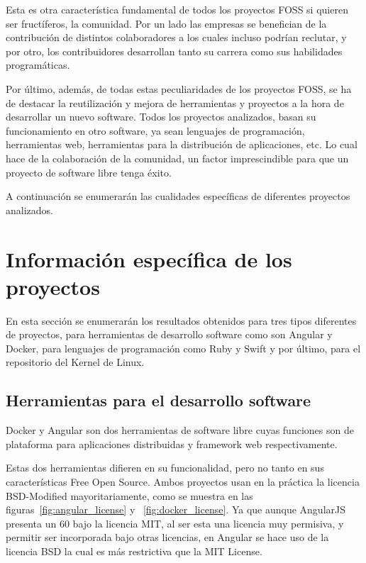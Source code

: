\documentclass[a4paper, spanish, 12pt]{book}
\begin{document}
Esta es otra caracter\'istica fundamental de todos los proyectos FOSS si quieren ser fruct\'iferos, la comunidad.
Por un lado las empresas se benefician de la contribuci\'on de distintos colaboradores a los cuales incluso
podr\'ian reclutar, y por otro, los contribuidores desarrollan tanto su carrera como sus habilidades program\'aticas.

Por \'ultimo, adem\'as, de todas estas peculiaridades de los proyectos FOSS, se ha de destacar la reutilizaci\'on y
mejora de herramientas y proyectos a la hora de desarrollar un nuevo software. Todos los proyectos analizados,
basan su funcionamiento en otro software, ya sean lenguajes de programaci\'on, herramientas web, herramientas para
la distribuci\'on de aplicaciones, etc. Lo cual hace de la colaboraci\'on de la comunidad, un factor imprescindible
para que un proyecto de software libre tenga \'exito.

A continuaci\'on se enumerar\'an las cualidades espec\'ificas de diferentes proyectos analizados.

\section{Informaci\'on espec\'ifica de los proyectos}
\label{sec:specific_info}

En esta secci\'on se enumerar\'an los resultados obtenidos para tres tipos diferentes de proyectos,
para herramientas de desarrollo software como son Angular y Docker, para lenguajes de programaci\'on como
Ruby y Swift y por \'ultimo, para el repositorio del Kernel de Linux.

\subsection{Herramientas para el desarrollo software}
\label{subsec:software_tools}

Docker y Angular son dos herramientas de software libre cuyas funciones son de plataforma para aplicaciones distribuidas
y framework web respectivamente.

Estas dos herramientas difieren en su funcionalidad, pero no tanto en sus caracter\'isticas Free Open Source.
Ambos proyectos usan en la pr\'actica la licencia BSD-Modified mayoritariamente, como se muestra en las
figuras~\ref{fig:angular_license} y ~\ref{fig:docker_license}. Ya que aunque AngularJS presenta un 60%
bajo la licencia MIT, al ser esta una licencia muy permisiva, y permitir ser incorporada bajo otras licencias,
en Angular se hace uso de la licencia BSD la cual es m\'as restrictiva que la MIT License.
\end{document}
